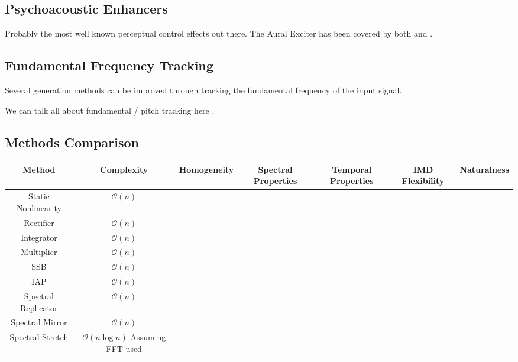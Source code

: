 	\subsection{Psychoacoustic Enhancers}
	\label{sec:Excitation-Enhancers}
		\note
		{
			Probably the most well known perceptual control effects out there. The Aural Exciter has been 
			covered by both \citet{chalupper2000aural} and \citet{shekar2013modeling}.
		}

	\subsection{Fundamental Frequency Tracking}
	\label{sec:Excitation-Fundamental}
		\note
		{
			Several generation methods can be improved through tracking the fundamental frequency of the input 
			signal.

			We can talk all about fundamental / pitch tracking here \citep{cuadra2001efficient, 
			gerhard2003pitch, prukkanon2009vt-amdf, larsen2004audio}.
		}

\begin{landscape}
\section{Methods Comparison}
\label{sec:Excitation-Comparison}

	\begin{tabular}{|c|c|c|c|c|c|c|}
		\hline
		\bf{Method} & \bf{Complexity} & \bf{Homogeneity} & \bf{Spectral Properties} & \bf{Temporal Properties} & \bf{IMD}
		\bf{Flexibility} & \bf{Naturalness} \\
		\hline
		Static Nonlinearity & $\mathcal{O}(n)$ & & & & & \\
		\hline
		Rectifier & $\mathcal{O}(n)$ & & & & & \\
		\hline
		Integrator & $\mathcal{O}(n)$ & & & & & \\
		\hline
		Multiplier & $\mathcal{O}(n)$ & & & & & \\
		\hline
		SSB & $\mathcal{O}(n)$ & & & & & \\
		\hline
		IAP & $\mathcal{O}(n)$ & & & & & \\
		\hline
		Spectral Replicator & $\mathcal{O}(n)$ & & & & & \\
		\hline
		Spectral Mirror & $\mathcal{O}(n)$ & & & & & \\
		\hline
		Spectral Stretch & $\mathcal{O}(n\log{n})$ Assuming FFT used & & & & & \\
		\hline
	\end{tabular}

\end{landscape}

